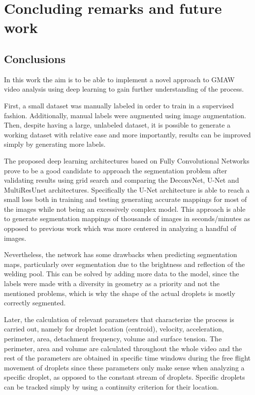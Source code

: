 \chapter{Concluding remarks and future work}\label{chap:conclusions}
\section{Conclusions}
In this work the aim is to be able to implement a novel approach to GMAW video analysis using deep learning to gain further understanding of the process.

First, a small dataset was manually labeled in order to train in a supervised fashion. Additionally, manual labels were augmented using image augmentation. Then, despite having a large, unlabeled dataset, it is possible to generate a working dataset with relative ease and more importantly, results can be improved simply by generating more labels.

The proposed deep learning architectures based on Fully Convolutional Networks prove to be a good candidate to approach the segmentation problem after validating results using grid search and comparing the DeconvNet, U-Net and MultiResUnet architectures. Specifically the U-Net architecture is able to reach a small loss both in training and testing generating accurate mappings for most of the images while not being an excessively complex model. This approach is able to generate segmentation mappings of thousands of images in seconds/minutes as opposed to previous work which was more centered in analyzing a handful of images.

Nevertheless, the network has some drawbacks when predicting segmentation maps, particularly over segmentation due to the brightness and reflection of the welding pool. This can be solved by adding more data to the model, since the labels were made  with a diversity in geometry as a priority and not the mentioned problems, which is why the shape of the actual droplets is mostly correctly segmented.

Later, the calculation of relevant parameters that characterize the process is carried out, namely for droplet location (centroid), velocity, acceleration, perimeter, area, detachment frequency, volume and surface tension. The perimeter, area and volume are calculated throughout the whole video and the rest of the parameters are obtained in specific time windows during the free flight movement of droplets since these parameters only make sense when analyzing a specific droplet, as opposed to the constant stream of droplets. Specific droplets can be tracked simply by using a continuity criterion for their location.

